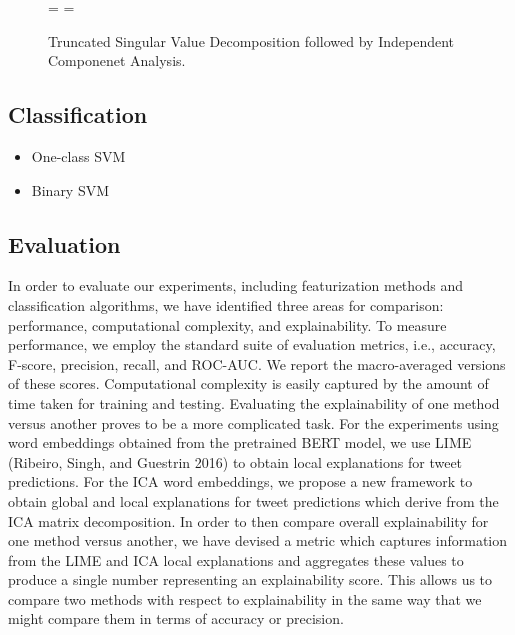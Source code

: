 \documentclass{article}
\begin{document}
\begin{figure}
  \centering
   = 
   
  \newline
  \newline
  \newline
   = 
   
  \caption{Truncated Singular Value Decomposition followed by Independent Componenet Analysis.}
  \label{fig:matdec}
\end{figure}

\hypertarget{classification}{%
\subsection{Classification}\label{classification}}

\begin{itemize}
\tightlist
\item
  One-class SVM
\item
  Binary SVM
\end{itemize}

\hypertarget{evaluation}{%
\subsection{Evaluation}\label{evaluation}}

In order to evaluate our experiments, including featurization methods
and classification algorithms, we have identified three areas for
comparison: performance, computational complexity, and explainability.
To measure performance, we employ the standard suite of evaluation
metrics, i.e., accuracy, F-score, precision, recall, and ROC-AUC. We
report the macro-averaged versions of these scores. Computational
complexity is easily captured by the amount of time taken for training
and testing. Evaluating the explainability of one method versus another
proves to be a more complicated task. For the experiments using word
embeddings obtained from the pretrained BERT model, we use LIME
(Ribeiro, Singh, and Guestrin 2016) to obtain local explanations for
tweet predictions. For the ICA word embeddings, we propose a new
framework to obtain global and local explanations for tweet predictions
which derive from the ICA matrix decomposition. In order to then compare
overall explainability for one method versus another, we have devised a
metric which captures information from the LIME and ICA local
explanations and aggregates these values to produce a single number
representing an explainability score. This allows us to compare two
methods with respect to explainability in the same way that we might
compare them in terms of accuracy or precision.
\end{document}
